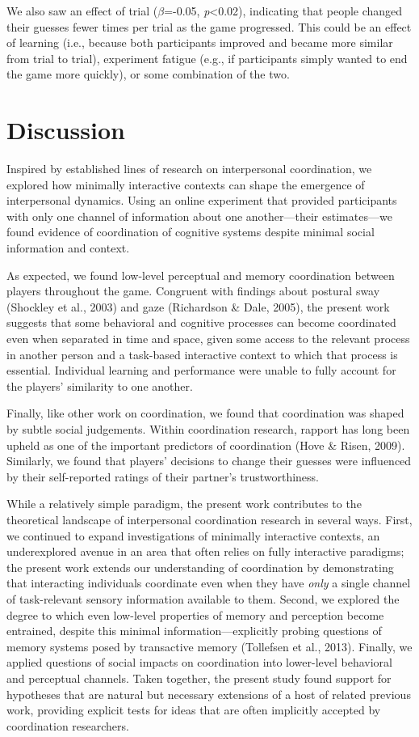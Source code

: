 \documentclass[10pt, letterpaper]{article}
\begin{document}
We also saw an effect of trial (\emph{\(\beta\)}=-0.05,
\emph{p}\textless{}0.02), indicating that people changed their guesses
fewer times per trial as the game progressed. This could be an effect of
learning (i.e., because both participants improved and became more
similar from trial to trial), experiment fatigue (e.g., if participants
simply wanted to end the game more quickly), or some combination of the
two.

\section{Discussion}\label{discussion}

Inspired by established lines of research on interpersonal coordination,
we explored how minimally interactive contexts can shape the emergence
of interpersonal dynamics. Using an online experiment that provided
participants with only one channel of information about one
another---their estimates---we found evidence of coordination of
cognitive systems despite minimal social information and context.

As expected, we found low-level perceptual and memory coordination
between players throughout the game. Congruent with findings about
postural sway (Shockley et al., 2003) and gaze (Richardson \& Dale,
2005), the present work suggests that some behavioral and cognitive
processes can become coordinated even when separated in time and space,
given some access to the relevant process in another person and a
task-based interactive context to which that process is essential.
Individual learning and performance were unable to fully account for the
players' similarity to one another.

Finally, like other work on coordination, we found that coordination was
shaped by subtle social judgements. Within coordination research,
rapport has long been upheld as one of the important predictors of
coordination (Hove \& Risen, 2009). Similarly, we found that players'
decisions to change their guesses were influenced by their self-reported
ratings of their partner's trustworthiness.

While a relatively simple paradigm, the present work contributes to the
theoretical landscape of interpersonal coordination research in several
ways. First, we continued to expand investigations of minimally
interactive contexts, an underexplored avenue in an area that often
relies on fully interactive paradigms; the present work extends our
understanding of coordination by demonstrating that interacting
individuals coordinate even when they have \emph{only} a single channel
of task-relevant sensory information available to them. Second, we
explored the degree to which even low-level properties of memory and
perception become entrained, despite this minimal
information---explicitly probing questions of memory systems posed by
transactive memory (Tollefsen et al., 2013). Finally, we applied
questions of social impacts on coordination into lower-level behavioral
and perceptual channels. Taken together, the present study found support
for hypotheses that are natural but necessary extensions of a host of
related previous work, providing explicit tests for ideas that are often
implicitly accepted by coordination researchers.
\end{document}
